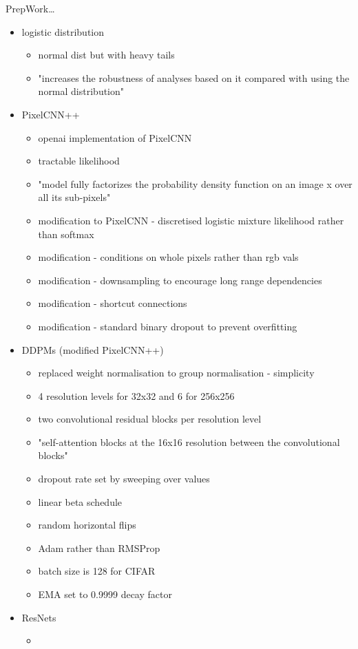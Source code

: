 \documentclass{article}
\begin{document}
PrepWork\dots

\begin{itemize}
    \item logistic distribution
    \begin{itemize}
        \item normal dist but with heavy tails 
        \item "increases the robustness of analyses based on it compared with using the normal distribution"
    \end{itemize}
    \item PixelCNN++
    \begin{itemize}
        \item openai implementation of PixelCNN
        \item tractable likelihood
        \item "model fully factorizes the probability density function on an image x over all its sub-pixels"
        \item modification to PixelCNN - discretised logistic mixture likelihood rather than softmax
        \item modification - conditions on whole pixels rather than rgb vals
        \item modification - downsampling to encourage long range dependencies
        \item modification - shortcut connections
        \item modification - standard binary dropout to prevent overfitting
    \end{itemize}
    \item DDPMs (modified PixelCNN++)
    \begin{itemize}
        \item replaced weight normalisation to group normalisation - simplicity 
        \item 4 resolution levels for 32x32 and 6 for 256x256
        \item two convolutional residual blocks per resolution level
        \item "self-attention blocks at the 16x16 resolution between the convolutional blocks"
        \item dropout rate set by sweeping over values
        \item linear beta schedule
        \item random horizontal flips
        \item Adam rather than RMSProp
        \item batch size is 128 for CIFAR
        \item EMA set to 0.9999 decay factor
    \end{itemize}
    \item ResNets
    \begin{itemize}
        \item 
    \end{itemize}
\end{itemize}
\end{document}
